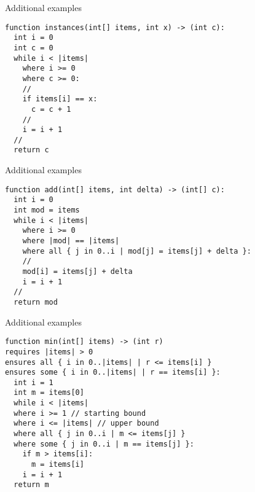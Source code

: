 \begin{frame}[fragile]{Additional examples}

\begin{verbatim}
function instances(int[] items, int x) -> (int c):
  int i = 0
  int c = 0
  while i < |items|
    where i >= 0
    where c >= 0:
    //
    if items[i] == x:
      c = c + 1
    //
    i = i + 1
  //
  return c
\end{verbatim}

\end{frame}

\begin{frame}[fragile]{Additional examples}

\begin{verbatim}
function add(int[] items, int delta) -> (int[] c):
  int i = 0
  int mod = items
  while i < |items|
    where i >= 0
    where |mod| == |items|
    where all { j in 0..i | mod[j] = items[j] + delta }:
    //
    mod[i] = items[j] + delta
    i = i + 1
  //
  return mod
\end{verbatim}

\end{frame}

\begin{frame}[fragile]{Additional examples}

\begin{verbatim}
function min(int[] items) -> (int r)
requires |items| > 0
ensures all { i in 0..|items| | r <= items[i] }
ensures some { i in 0..|items| | r == items[i] }:
  int i = 1
  int m = items[0]
  while i < |items|
  where i >= 1 // starting bound
  where i <= |items| // upper bound
  where all { j in 0..i | m <= items[j] }
  where some { j in 0..i | m == items[j] }:
    if m > items[i]:
      m = items[i]
    i = i + 1
  return m
\end{verbatim}


\end{frame}


